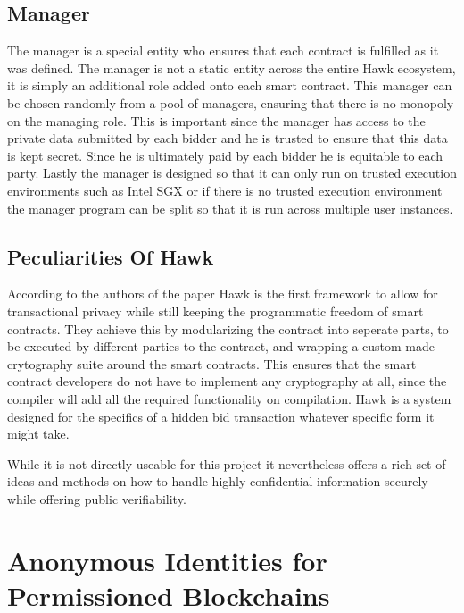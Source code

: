 \subsection{Manager}
The manager is a special entity who ensures that each contract is fulfilled as it was defined. The manager is not a static entity across the entire Hawk ecosystem, it is simply an additional role added onto each smart contract. This manager can be chosen randomly from a pool of managers, ensuring that there is no monopoly on the managing role. This is important since the manager has access to the private data submitted by each bidder and he is trusted to ensure that this data is kept secret. Since he is ultimately paid by each bidder he is equitable to each party. Lastly the manager is designed so that it can only run on trusted execution environments such as Intel SGX or if there is no trusted execution environment the manager program can be split so that it is run across multiple user instances.\cite[p.840]{Hawk}

\subsection{Peculiarities Of Hawk}
According to the authors of the paper Hawk is the first framework to allow for transactional privacy while still keeping the programmatic freedom of smart contracts.\cite[p.842-843]{Hawk} They achieve this by modularizing the contract into seperate parts, to be executed by different parties to the contract, and wrapping a custom made crytography suite around the smart contracts. This ensures that the smart contract developers do not have to implement any cryptography at all, since the compiler will add all the required functionality on compilation. Hawk is a system designed for the specifics of a hidden bid transaction whatever specific form it might take.\cite[p.839]{Hawk}

While it is not directly useable for this project it nevertheless offers a rich set of ideas and methods on how to handle highly confidential information securely while offering public verifiability.

\section{Anonymous Identities for Permissioned Blockchains}

